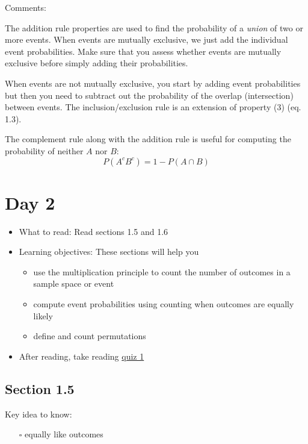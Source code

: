 \documentclass[
  letterpaper,
]{scrbook}
\providecommand{\tightlist}{%
  \setlength{\itemsep}{0pt}\setlength{\parskip}{0pt}}\usepackage{longtable,booktabs,array}
\begin{document}
Comments:

The addition rule properties are used to find the probability of a
\emph{union} of two or more events. When events are mutually exclusive,
we just add the individual event probabilities. Make sure that you
assess whether events are mutually exclusive before simply adding their
probabilities.

When events are not mutually exclusive, you start by adding event
probabilities but then you need to subtract out the probability of the
overlap (intersection) between events. The inclusion/exclusion rule is
an extension of property (3) (eq. 1.3).

The complement rule along with the addition rule is useful for computing
the probability of neither \(A\) nor \(B\): \[
P(A^c B^c) = 1 - P(A \cap B)
\]

\section*{Day 2}\label{day-2}


\begin{itemize}
\item
  What to read: Read sections 1.5 and 1.6
\item
  Learning objectives: These sections will help you

  \begin{itemize}
  \tightlist
  \item
    use the multiplication principle to count the number of outcomes in
    a sample space or event
  \item
    compute event probabilities using counting when outcomes are equally
    likely
  \item
    define and count permutations
  \end{itemize}
\item
  After reading, take reading
  \href{https://forms.gle/JeRauvsZLp4FqnUK6}{quiz 1}
\end{itemize}

\subsection*{Section 1.5}\label{section-1.5}

Key idea to know:

\begin{itemize}
\tightlist
\item[$\square$]
  equally like outcomes
\end{itemize}
\end{document}
